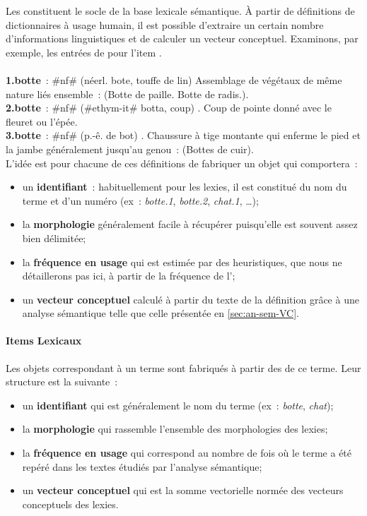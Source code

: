 Les  constituent le socle de la base lexicale
sémantique. À partir de définitions de dictionnaires à usage humain,
il est possible d'extraire un certain nombre d'informations
linguistiques et de calculer un vecteur conceptuel. Examinons, par
exemple, les entrées de \cite{Larousse2004} pour l'item
.
\\
\\
\textbf{1.botte}~: \#nf\# (néerl. bote, touffe de lin) Assemblage de
végétaux de même nature liés ensemble~: (Botte de paille. Botte
de radis.).\\
\textbf{2.botte}~: \#nf\# (\#ethym-it\# botta, coup) . Coup de pointe
donné avec le fleuret ou l'épée.\\
\textbf{3.botte}~: \#nf\# (p.-ê. de bot) . Chaussure à tige montante
qui enferme le pied et la jambe généralement jusqu'au genou~: (Bottes
de cuir).\\

L'idée est pour chacune de ces définitions de fabriquer un objet
 qui comportera~:

\begin{itemize}
\item un \textbf{identifiant}~: habituellement pour les lexies, il est
  constitué du nom du terme et d'un numéro (ex~: \emph{botte.1},
  \emph{botte.2}, \emph{chat.1}, \ldots);
\item la \textbf{morphologie} généralement facile à récupérer
  puisqu'elle est souvent assez bien délimitée;
\item la \textbf{fréquence en usage} qui est estimée par des
  heuristiques, que nous ne détaillerons pas ici, à partir de la
  fréquence de l';
\item un \textbf{vecteur conceptuel} calculé à partir du texte de la
  définition grâce à une analyse sémantique telle que celle présentée
  en \ref{sec:an-sem-VC}.
\end{itemize}
  
\paragraph{Items Lexicaux}\label{sec:items-lexicaux}

Les objets  correspondant à un terme sont
fabriqués à partir des  de ce terme. Leur structure est
la suivante~:

\begin{itemize}
\item un \textbf{identifiant} qui est généralement le nom du terme
  (ex~: \emph{botte}, \emph{chat});
\item la \textbf{morphologie} qui rassemble l'ensemble des
  morphologies des lexies;
\item la \textbf{fréquence en usage} qui correspond au nombre de fois
  où le terme a été repéré dans les textes étudiés par l'analyse
  sémantique;
\item un \textbf{vecteur conceptuel} qui est la somme vectorielle
  normée des vecteurs conceptuels des
  lexies.
\end{itemize}

